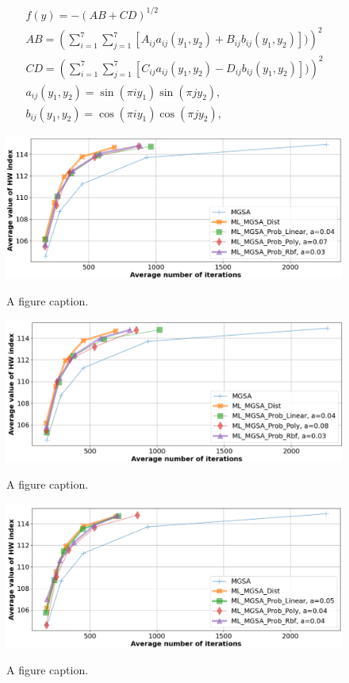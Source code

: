 \documentclass[runningheads]{llncs}
\begin{document}
\begin{equation}
    \label{eq:19}
		\begin{matrix}
		  f(y)= -(AB + CD)^{1/2} \\
			AB =(\sum_{i=1}^7{\sum_{j=1}^7{[A_{ij} a_{ij} (y_1,y_2) + B_{ij} b_{ij} (y_1,y_2)])}})^2 \\
			CD =(\sum_{i=1}^7{\sum_{j=1}^7{[C_{ij} a_{ij} (y_1,y_2) - D_{ij} b_{ij} (y_1,y_2)])}})^2 \\
			a_{ij} (y_1,y_2) = \sin(\pi i y_1) \sin(\pi j y_2), \\
			b_{ij} (y_1,y_2) = \cos(\pi i y_1) \cos(\pi j y_2),
		\end{matrix}
\end{equation}


\begin{figure}
\includegraphics[width=\textwidth]{fig3.png}
\label{fig3}
\caption{A figure caption.} 
\end{figure}

\begin{figure}
\includegraphics[width=\textwidth]{fig4.png}
\label{fig4}
\caption{A figure caption.} 
\end{figure}

\begin{figure}
\includegraphics[width=\textwidth]{fig5.png}
\label{fig5}
\caption{A figure caption.} 
\end{figure}
\end{document}
